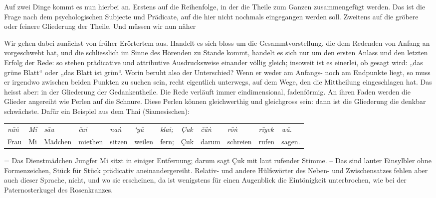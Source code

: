 Auf zwei Dinge kommt es nun hierbei an. Erstens auf die Reihenfolge, in der die Theile zum Ganzen zusammengefügt werden. Das ist die Frage nach dem psychologischen Subjecte und Prädicate, auf die hier nicht nochmals eingegangen werden soll. Zweitens auf die gröbere oder feinere Gliederung der Theile. Und  müssen wir nun näher 

\largerpage[-2]Wir gehen dabei zunächst von früher Erörtertem aus. Handelt es sich bloss um die Gesammtvorstellung, die dem Redenden von Anfang an \label{fp.432} vorgeschwebt hat, und die schliesslich im Sinne des Hörenden zu Stande kommt, handelt es sich nur um den ersten Anlass und den letzten Erfolg der Rede: so stehen prädicative und attributive Ausdrucksweise einander völlig gleich; insoweit ist es einerlei, ob gesagt wird: „das grüne Blatt“ oder „das Blatt ist grün“. Worin beruht also der Unterschied? Wenn er weder am Anfangs- noch am Endpunkte liegt, so muss er irgendwo zwischen beiden Punkten zu suchen sein, recht eigentlich unterwegs, auf dem Wege, den die Mittheilung eingeschlagen hat. Das heisst aber: in der Gliederung der Gedankentheile. Die Rede verläuft immer eindimensional, fadenförmig. An ihren Faden werden die Glieder angereiht wie Perlen auf die Schnure. Diese Perlen können gleichwerthig und gleichgross sein: dann ist die Gliederung die denkbar schwächste. Dafür ein Beispiel aus dem Thai (Siamesischen):

\begin{tabular}{l l l l l l l l l l l l}
 \textit{nāṅ} & \textit{Mī} & \textit{sāu} & \textit{čai} & \textit{naṅ} & \textit{‘yū} & \textit{klai;} & \textit{Çuk} & \textit{čüṅ} & \textit{rōṅ} & \textit{rīyek} & \textit{wā.} \\
Frau & Mi & Mädchen & miethen & sitzen & weilen & fern; & Çuk & darum & schreien & rufen & sagen.
\end{tabular}

\noindent = Das Dienstmädchen Jungfer Mi sitzt in einiger Entfernung; darum sagt Çuk mit laut rufender Stimme. – Das sind lauter Einsylbler ohne Formenzeichen, Stück für Stück prädicativ aneinandergereiht. Relativ- und andere Hülfswörter des Neben- und Zwischensatzes fehlen aber auch dieser Sprache, nicht, und wo sie erscheinen, da ist wenigstens für einen Augenblick die Eintönigkeit unterbrochen, wie bei der Paternosterkugel des Rosenkranzes.

